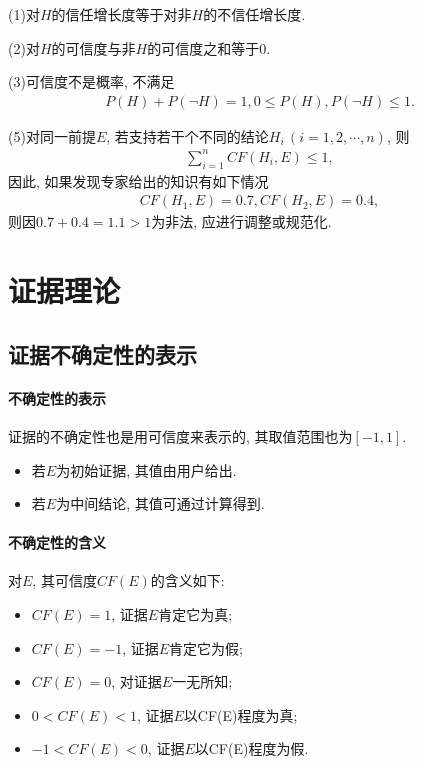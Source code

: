         (1)对$H$的信任增长度等于对非$H$的不信任增长度.

        (2)对$H$的可信度与非$H$的可信度之和等于0.

        (3)可信度不是概率, 不满足
\begin{align*}
  P(H)+P(\neg H)=1, 0\leq P(H), P(\neg H)\leq 1.
\end{align*}

(5)对同一前提$E$, 若支持若干个不同的结论$H_i\,(i=1,2,\cdots,n)$, 则
\begin{align*}
  \sum_{i=1}^{n} C F\left(H_{i}, E\right) \leq 1,
\end{align*}
因此, 如果发现专家给出的知识有如下情况
\begin{align*}
  CF(H_1, E)=0.7,  CF(H_2, E)=0.4,
\end{align*}
则因$0.7+0.4=1.1>1$为非法, 应进行调整或规范化.
\section{证据理论}
\subsection{证据不确定性的表示}
\paragraph{不确定性的表示}
证据的不确定性也是用可信度来表示的, 其取值范围也为$[-1,1]$.　
\begin{itemize}
\item 若$E$为初始证据, 其值由用户给出.
\item 若$E$为中间结论, 其值可通过计算得到.
\end{itemize}
\paragraph{不确定性的含义}
对$E$, 其可信度$CF(E)$的含义如下:
\begin{center}
\begin{itemize}
\item $CF(E)=1$, 证据$E$肯定它为真;
\item $CF(E)=-1$, 证据$E$肯定它为假;
\item $CF(E)=0$, 对证据$E$一无所知;
\item $0<CF(E)<1$, 证据$E$以CF(E)程度为真;
\item $-1<CF(E)<0$, 证据$E$以CF(E)程度为假.
\end{itemize}
\end{center}
